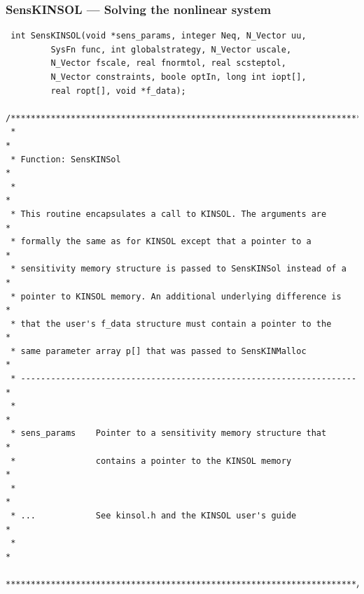 \documentclass[11pt]{article}
\begin{document}
\subsubsection{SensKINSOL --- Solving the nonlinear system}
\small
\begin{verbatim}
 int SensKINSOL(void *sens_params, integer Neq, N_Vector uu,
         SysFn func, int globalstrategy, N_Vector uscale,
         N_Vector fscale, real fnormtol, real scsteptol,
         N_Vector constraints, boole optIn, long int iopt[],
         real ropt[], void *f_data);

/**********************************************************************
 *                                                                    *
 * Function: SensKINSol                                               *
 *                                                                    *
 * This routine encapsulates a call to KINSOL. The arguments are      *
 * formally the same as for KINSOL except that a pointer to a         *
 * sensitivity memory structure is passed to SensKINSol instead of a  *
 * pointer to KINSOL memory. An additional underlying difference is   *
 * that the user's f_data structure must contain a pointer to the     *
 * same parameter array p[] that was passed to SensKINMalloc          *
 * -------------------------------------------------------------------*
 *                                                                    *
 * sens_params    Pointer to a sensitivity memory structure that      *
 *                contains a pointer to the KINSOL memory             *
 *                                                                    *
 * ...            See kinsol.h and the KINSOL user's guide            *
 *                                                                    *
 **********************************************************************/

\end{verbatim}
\normalsize
\end{document}
